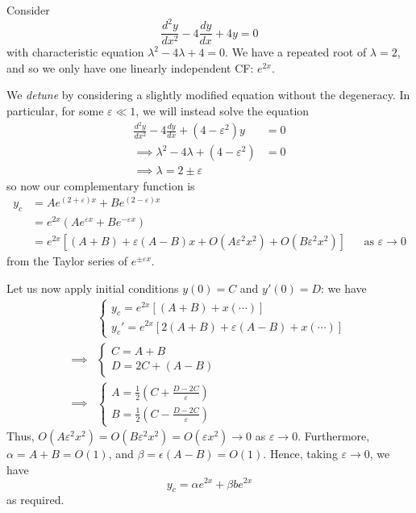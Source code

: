 \documentclass{../../template/note}
\begin{document}
    \begin{example}
        Consider
        \[
            \frac{d^2y}{dx^2} - 4 \frac{dy}{dx} + 4y = 0
        \]
        with characteristic equation \(\lambda^2 - 4 \lambda + 4 = 0\). We have a repeated root of \(\lambda = 2\), and so we only have one linearly independent CF: \(e^{2x}\).

        We \emph{detune} by considering a slightly modified equation without the degeneracy. In particular, for some \(\varepsilon \ll 1\), we will instead solve the equation
        \begin{align*}
            \frac{d^2y}{dx^2} - 4 \frac{dy}{dx} + (4-\varepsilon^2)y &= 0 \\
            \implies \lambda^2 - 4\lambda + (4-\varepsilon^2) &= 0 \\
            \implies \lambda = 2 \pm \varepsilon
        \end{align*}
        so now our complementary function is
        \begin{align*}
            y_c &= Ae^{(2+\varepsilon)x} + Be^{(2-\varepsilon)x} \\
            &= e^{2x}(Ae^{\varepsilon x}+Be^{-\varepsilon x}) \\
            &= e^{2x}\left[(A+B) + \varepsilon(A-B)x + O(A\varepsilon^2 x^2) + O(B \varepsilon^2 x^2)\right] && \text{as } \varepsilon \to 0
        \end{align*}
        from the Taylor series of \(e^{\pm \varepsilon x}\).
        
        Let us now apply initial conditions \(y(0) = C\) and \(y'(0) = D\): we have
        \begin{align*}
            &\begin{cases}
                y_c = e^{2x}[(A + B) + x(\cdots)] \\
                y_c' = e^{2x}[2(A + B) + \varepsilon(A-B) + x(\cdots)]
            \end{cases} \\
            \implies &\begin{cases}
                C = A + B \\
                D = 2C + (A - B)
            \end{cases} \\
            \implies &\begin{cases}
                A = \frac{1}{2}\left(C + \frac{D-2C}{\varepsilon}\right) \\
                B = \frac{1}{2}\left(C - \frac{D-2C}{\varepsilon}\right)
            \end{cases}
        \end{align*}
        Thus, \(O(A \varepsilon^2 x^2) = O(B \varepsilon^2 x^2) = O(\varepsilon x^2) \to 0\) as \(\varepsilon \to 0\). Furthermore, \(\alpha = A + B = O(1)\), and \(\beta = \epsilon(A-B) = O(1)\). Hence, taking \(\varepsilon \to 0\), we have
        \[
            y_c = \alpha e^{2x} + \beta be^{2x}
        \]
        as required.
    \end{example}
    
\end{document}
